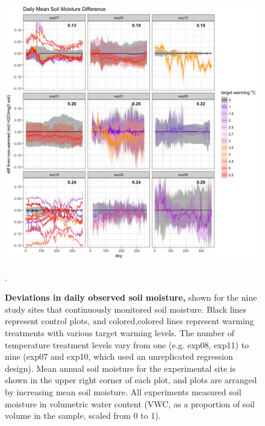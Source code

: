 \documentclass{article}
\begin{document}
 \begin{figure}[h]
    \centering
 \includegraphics{../Analyses/figures/Exploratory_TimeSeries_SoilMoist_Deviation.png}  
 \caption{\textbf{Deviations in daily observed soil moisture,} shown for the nine  study sites that continuously monitored soil moisture. Black lines represent control plots, and colored,colored lines represent warming treatments with various target warming levels. The number of temperature treatment levels vary from one (e.g. exp08, exp11) to nine (exp07 and exp10, which used an unreplicated regression design). Mean annual soil moisture for the experimental site is shown in the upper right corner of each plot, and plots are arranged by increasing mean soil moisture. All experiments measured soil moisture in volumetric water content (VWC, as a proportion of soil volume in the sample, scaled from 0 to 1).}. 
 \label{fig:mois}
 \end{figure}
\end{document}
